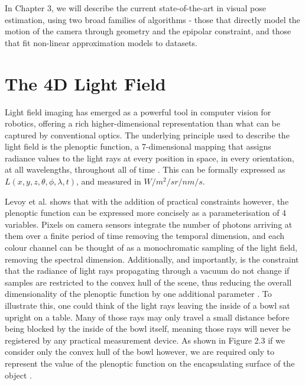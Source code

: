 In Chapter 3, we will describe the current state-of-the-art in visual pose estimation, using two broad families of algorithms - those that directly model the motion of the camera through geometry and the epipolar constraint, and those that fit non-linear approximation models to datasets. 


\section{The 4D Light Field}
Light field imaging has emerged as a powerful tool in computer vision for robotics, offering a rich higher-dimensional representation than what can be captured by conventional optics. The underlying principle used to describe the light field is the plenoptic function, a 7-dimensional mapping that assigns radiance values to the light rays at every position in space, in every orientation, at all wavelengths, throughout all of time \cite{adelson1991plenoptic}. This can be formally expressed as $L(x,y,z,\theta, \phi, \lambda, t)$, and measured in $W/m^2/sr/nm/s$. 


Levoy et al. \cite{levoy1996lfrendering} shows that with the addition of practical constraints however, the plenoptic function can be expressed more concisely as a parameterisation of 4 variables. Pixels on camera sensors integrate the number of photons arriving at them over a finite period of time removing the temporal dimension, and each colour channel can be thought of as a monochromatic sampling of the light field, removing the spectral dimension. Additionally, and importantly, is the constraint that the radiance of light rays propagating through a vacuum do not change if samples are restricted to the convex hull of the scene, thus reducing the overall dimensionality of the plenoptic function by one additional parameter \cite{levoy1996lfrendering}. To illustrate this, one could think of the light rays leaving the inside of a bowl sat upright on a table. Many of those rays may only travel a small distance before being blocked by the inside of the bowl itself, meaning those rays will never be registered by any practical measurement device. As shown in Figure 2.3 if we consider only the convex hull of the bowl however, we are required only to represent the value of the plenoptic function on the encapsulating surface of the object \cite{gortler1996lumigraph}.

